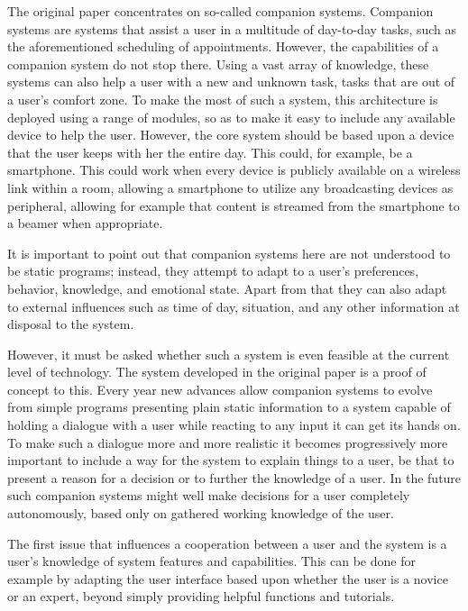 \documentclass[a4paper]{article}
\begin{document}
The original paper concentrates on so-called companion systems. Companion systems are systems that assist a user in a multitude of day-to-day tasks, such as the aforementioned scheduling of appointments. However, the capabilities of a companion system do not stop there. Using a vast array of knowledge, these systems can also help a user with a new and unknown task, tasks that are out of a user's comfort zone. To make the most of such a system, this architecture is deployed using a range of modules, so as to make it easy to include any available device to help the user. However, the core system should be based upon a device that the user keeps with her the entire day. This could, for example, be a smartphone. This could work when every device is publicly available on a wireless link within a room, allowing a smartphone to utilize any broadcasting devices as peripheral, allowing for example that content is streamed from the smartphone to a beamer when appropriate.

It is important to point out that companion systems here are not understood to be static programs; instead, they attempt to adapt to a user's preferences, behavior, knowledge, and emotional state. Apart from that they can also adapt to external influences such as time of day, situation, and any other information at disposal to the system.

However, it must be asked whether such a system is even feasible at the current level of technology. The system developed in the original paper is a proof of concept to this. Every year new advances allow companion systems to evolve from simple programs presenting plain static information to a system capable of holding a dialogue with a user while reacting to any input it can get its hands on. To make such a dialogue more and more realistic it becomes progressively more important to include a way for the system to explain things to a user, be that to present a reason for a decision or to further the knowledge of a user. In the future such companion systems might well make decisions for a user completely autonomously, based only on gathered working knowledge of the user.

The first issue that influences a cooperation between a user and the system is a user's knowledge of system features and capabilities. This can be done for example by adapting the user interface based upon whether the user is a novice or an expert, beyond simply providing helpful functions and tutorials.
\end{document}
